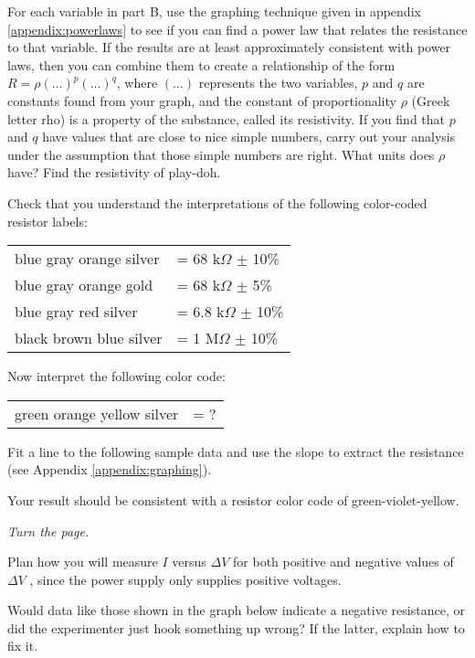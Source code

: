 \analysis

For each variable in part B,
use the graphing technique given in appendix \ref{appendix:powerlaws} to see if you can
find a power law that relates the resistance to that variable. If the results are at least
approximately consistent with power laws, then you can combine them to create a relationship
of the form $R=\rho(\ldots)^p(\ldots)^q$, where $(\ldots)$ represents the two variables,
$p$ and $q$ are constants found from your graph, and the constant of proportionality $\rho$
(Greek letter rho) is a property of the substance, called its resistivity. If you find that
$p$ and $q$ have values that are close to nice simple numbers, carry out your analysis under
the assumption that those simple numbers are right. What units does $\rho$ have?
Find the resistivity of play-doh.

\vfill

\prelab

\prelabquestion  Check that you understand the interpretations of the
following color-coded resistor labels:

\begin{tabular}{ll}
   blue   gray   orange   silver    &= 68 k$\Omega$  $\pm$ 10\%  \\
   blue   gray   orange   gold    &= 68 k$\Omega$  $\pm$ 5\%  \\
   blue   gray   red   silver    &= 6.8 k$\Omega$  $\pm$ 10\%  \\
   black   brown   blue   silver    &= 1 M$\Omega$  $\pm$ 10\%  
\end{tabular}

Now interpret the following color code:

\begin{tabular}{ll}
   green   orange   yellow   silver    &=    ?  
\end{tabular}

\prelabquestion  Fit a line to the following sample data and use the
slope to extract the resistance (see Appendix \ref{appendix:graphing}).


Your result should be consistent with a resistor color code
of green-violet-yellow.

\hfill\emph{Turn the page.}

\pagebreak

\prelabquestion  Plan how you will measure $I$ versus $\Delta V$ for both
positive and negative values of $\Delta V$ , since the power
supply only supplies positive voltages.


\prelabquestion  Would data like those shown in the graph below indicate a negative resistance, or
did the experimenter just hook something up wrong? If the
latter, explain how to fix it.

